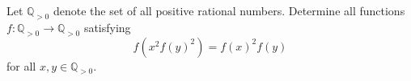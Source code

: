 Let $\mathbb{Q}_{>0}$ denote the set of all positive rational numbers. Determine all functions $f:\mathbb{Q}_{>0}\to\mathbb{Q}_{>0}$ satisfying \[f(x^2f(y)^2)=f(x)^2f(y)\] for all $x,y\in\mathbb{Q}_{>0}$.
